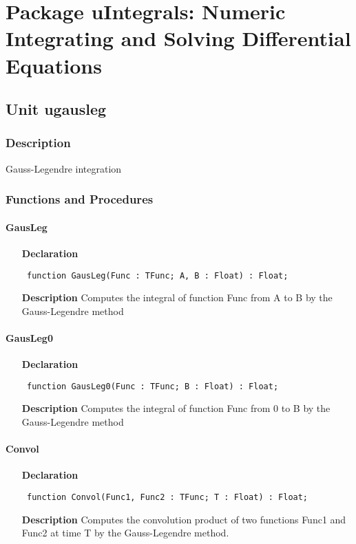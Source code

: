 \documentclass[12pt,a4paper,oneside]{report}
\newcommand{\declarationitem}[1]{\textbf{#1}}
\newcommand{\descriptiontitle}[1]{\textbf{#1}}
\newcommand{\code}[1]{\texttt{#1}}
\begin{document}
\chapter{Package uIntegrals: Numeric Integrating and Solving Differential Equations}\label{package-uintegrals}
\section{Unit ugausleg}
\label{ugausleg}
\subsection{Description}
Gauss-Legendre integration
\subsection{Functions and Procedures}
\subsubsection{GausLeg}
\label{ugausleg-GausLeg}
\begin{itemize}\item[\declarationitem{Declaration}\hfill]
	\begin{flushleft}
		\code{
			function GausLeg(Func : TFunc; A, B : Float) : Float;}
		
	\end{flushleft}
	
	\par
	\item[\descriptiontitle{Description}]
	Computes the integral of function Func from A to B
	by the Gauss-Legendre method
\end{itemize}
\subsubsection{GausLeg0}
\label{ugausleg-GausLeg0}
\begin{itemize}\item[\declarationitem{Declaration}\hfill]
	\begin{flushleft}
		\code{
			function GausLeg0(Func : TFunc; B : Float) : Float;}
	\end{flushleft}
	\item[\descriptiontitle{Description}]
	Computes the integral of function Func from 0 to B
	by the Gauss-Legendre method
\end{itemize}
\subsubsection{Convol}
\label{ugausleg-Convol}
\begin{itemize}\item[\declarationitem{Declaration}\hfill]
	\begin{flushleft}
		\code{
			function Convol(Func1, Func2 : TFunc; T : Float) : Float;}
	\end{flushleft}
	\item[\descriptiontitle{Description}]
	Computes the convolution product of two functions Func1 and Func2 at time T by the Gauss-Legendre method.
\end{itemize}
\end{document}

